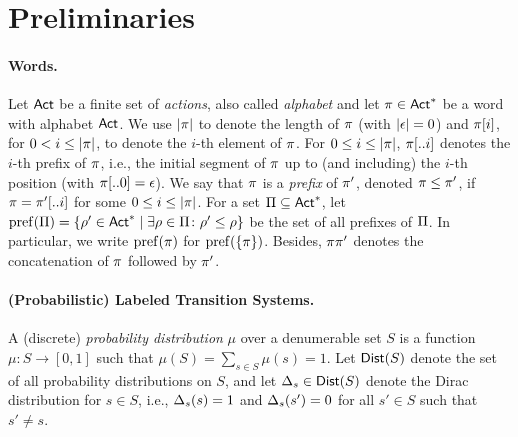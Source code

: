 \section{Preliminaries}
\label{sec:preliminaries}



\paragraph{Words.} Let ${\rm \sf Act}$ be a finite set of \emph{actions}, also called
\emph{alphabet} and let $\pi\in{\rm \sf Act}^*$ be a word with alphabet
${\rm \sf Act}$.  We use ${|}{\pi}{|}$ to denote the length of $\pi$ (with
${|}{\epsilon}{|}=0$) and $\pi[i]$, for $0<i\leq{|}{\pi}{|}$,
to denote the $i$-th element of $\pi$.
%
For $0\leq i\leq{|}{\pi}{|}$, $\pi[..i]$ denotes the $i$-th prefix
of $\pi$, i.e., the initial segment of $\pi$ up to (and including)
the $i$-th position (with $\pi[..0] = \epsilon$).
%
We say that $\pi$ is a \emph{prefix} of $\pi'$, denoted
$\pi\leq\pi'$, if $\pi=\pi'[..i]$ for some $0\leq
i\leq{|}{\pi}{|}$.  For a set $\Pi\subseteq{\rm \sf Act}^*$, let
$\mathrm{pref}(\Pi)=\{\rho'\in{\rm \sf Act}^*\mid{\exists{\rho\in\Pi}\colon{\rho'\leq\rho}}\}$
be the set of all prefixes of $\Pi$.  In particular, we write
$\mathrm{pref}(\pi)$ for $\mathrm{pref}(\{\pi\})$.
%
Besides, $\pi\pi'$ denotes the concatenation of $\pi$ followed by
$\pi'$.


\paragraph{(Probabilistic) Labeled Transition Systems.} 
A (discrete) \emph{probability distribution} $\mu$ over a denumerable
set $S$ is a function $\mu: S \rightarrow [0, 1] $ such that
$\mu(S) = \sum_{s \in S} \mu(s) = 1$.  Let $\mathsf{Dist}(S)$ denote the set
of all probability distributions on $S$, and let $\Delta_s \in \mathsf{Dist}(S)$
denote the Dirac distribution for $s \in S$, i.e., $\Delta_s(s) =1$
and $\Delta_s(s') = 0$ for all $s' \in S$ such that $s'\neq s$.



